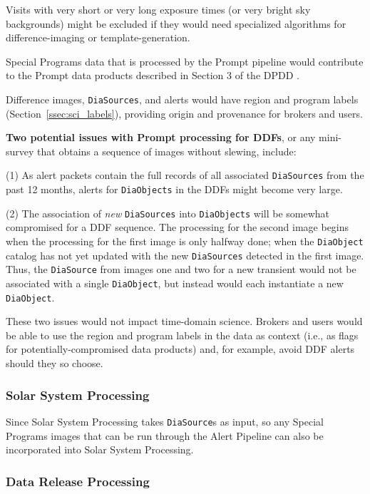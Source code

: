 Visits with very short or very long exposure times (or very bright sky 
backgrounds) might be excluded if they would 
need specialized algorithms for difference-imaging or template-generation.

Special Programs data that is processed by the Prompt pipeline would 
contribute to the Prompt data products described in Section 3 of the 
DPDD . 

Difference images, {\tt DiaSources}, and alerts would have region and 
program labels (Section~\ref{ssec:sci_labels}), providing origin and
provenance for brokers and users.

\textbf{Two potential issues with Prompt processing for DDFs}, 
or any mini-survey that obtains a sequence of images without slewing, 
include:

(1) As alert packets contain the full records of all associated 
{\tt DiaSources} from the past 12 months, alerts for {\tt DiaObjects} in 
the DDFs might become very large.

(2) The association of {\it new} {\tt DiaSources} into {\tt DiaObjects} 
will be somewhat compromised for a DDF sequence.
The processing for the second image begins when the processing for the 
first image is only halfway done; when the {\tt DiaObject} catalog has 
not yet updated with the new {\tt DiaSources} detected in the first image.
Thus, the {\tt DiaSource} from images one and two for a new transient 
would not be associated with a single {\tt DiaObject}, but instead would 
each instantiate a new {\tt DiaObject}.

These two issues would not impact time-domain science.
Brokers and users would be able to use the region and program labels
in the data as context (i.e., as flags for potentially-compromised 
data products) and, for example, avoid DDF alerts should they so choose.


\subsubsection{Solar System Processing}\label{sssec:proc_reg_ss}

Since Solar System Processing takes {\tt DiaSource}s as input, so any 
Special Programs images that can be run through the Alert Pipeline can 
also be incorporated into Solar System Processing.


\subsubsection{Data Release Processing}\label{sssec:proc_reg_dr}

